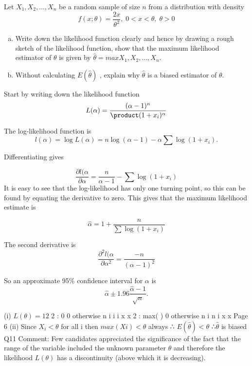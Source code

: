 \item 
Let $X_1 , X_2 , \ldots, X_n$ be a random sample of size $n$ from a distribution with density \[f ( x ; θ ) = \frac{2x}{\theta^2} , \; 0 <x < \theta, \; \theta >0 \]

\begin{enumerate}[(a)]
\item Write down the likelihood function clearly and hence by drawing a rough sketch of the likelihood function, show that the maximum likelihood estimator of $\theta$ is given by $\hat{\theta} = max{ X_1 , X_2 , \ldots, X_n }$.
\item
Without calculating $E ( \hat{\theta} )$ , explain why $\hat{\theta}$ is a biased estimator of $\theta$.
\end{enumerate}

Start by writing down the likelihood function
\[ L(\alpha) = \frac{( \alpha - 1)^n}{\product (1 + x_i )^\alpha}\]

The log-likelihood function is
\[ l(\alpha)  = \log L(\alpha) = n \log(\alpha - 1) - \alpha \sum \log(1 + x_i ).\]

Differentiating gives

\[ \frac{\partial l(\alpha}{ \partial \alpha} = \frac{n}{\alpha -1} - \sum \log(1 + x_i ) \]
It is easy to see that the log-likelihood has only one turning point, so this can be found by equating the derivative to zero. This gives that the maximum likelihood estimate is

\[ \hat{\alpha} = 1 + \frac{n}{ \sum \log(1 + x_i )}\]

The second derivative is
\[ \frac{\partial^2 l(\alpha}{ \partial \alpha^2} = \frac{-n}{(\alpha -1)^2} \]

So an approximate 95\% confidence interval for $\alpha$ is 
\[ \hat{\alpha} \pm  1.96 \frac{\hat{\alpha} - 1}{\sqrt{n}} .\]

\newpage
 (i) $L(\theta) = 1 2$
2
: 0
0 otherwise
n
i
i i
x
x
2
: max( )
0 otherwise
n
i
n i
x
x
Page 6
(ii) Since $X_i < \theta$ for all i
then $max(Xi) < \theta$ always
∴ $E( \hat{\theta}) < \theta$ ∴$\hat{\theta}$ is biased
Q11 Comment: Few candidates appreciated the significance of the fact that the range of the variable included the unknown parameter $\theta$ and therefore the likelihood $L(\theta)$ has a discontinuity (above which it is decreasing).




